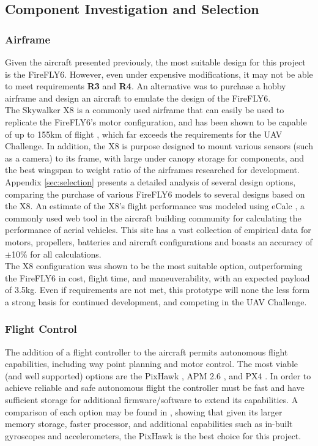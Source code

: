\subsection{Component Investigation and Selection}
\subsubsection*{Airframe}
Given the aircraft presented previously, the most suitable design for this project is the FireFLY6. However, even under expensive modifications, it may not be able to meet requirements \textbf{R3} and \textbf{R4}. An alternative was to purchase a hobby airframe and design an aircraft to emulate the design of the FireFLY6.\\

The Skywalker X8 \cite{ref:x8} is a commonly used airframe that can easily be used to replicate the FireFLY6's motor configuration, and has been shown to be capable of up to 155km of flight \cite{ref:range}, which far exceeds the requirements for the UAV Challenge. In addition, the X8 is purpose designed to mount various sensors (such as a camera) to its frame, with large under canopy storage for components, and the best wingspan to weight ratio of the airframes researched for development.\\

Appendix \ref{sec:selection} presents a detailed analysis of several design options, comparing the purchase of various FireFLY6 models to several designs based on the X8. An estimate of the X8's flight performance was modeled using eCalc \cite{ref:ecalc}, a commonly used web tool in the aircraft building community for calculating the performance of aerial vehicles. This site has a vast collection of empirical data for motors, propellers, batteries and aircraft configurations and boasts an accuracy of $\pm$10\% for all calculations.\\

The X8 configuration was shown to be the most suitable option, outperforming the FireFLY6 in cost, flight time, and maneuverability, with an expected payload of 3.5kg. Even if requirements are not met, this prototype will none the less form a strong basis for continued development, and competing in the UAV Challenge.\\


\subsubsection*{Flight Control}
The addition of a flight controller to the aircraft permits autonomous flight capabilities, including way point planning and motor control. The most viable (and well supported) options are the PixHawk \cite{ref:pixhawk}, APM 2.6 \cite{ref:ardupilot}, and PX4 \cite{ref:px4}. In order to achieve reliable and safe autonomous flight the controller must be fast and have sufficient storage for additional firmware/software to extend its capabilities. A comparison of each option may be found in \cite{ref:controller_comparison}, showing that given its larger memory storage, faster processor, and additional capabilities such as in-built gyroscopes and accelerometers, the PixHawk is the best choice for this project.

